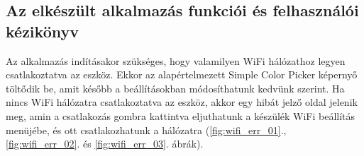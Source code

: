 \documentclass[../main.tex]{subfiles}
\begin{document}
    \subsection{Az elkészült alkalmazás funkciói és felhasználói kézikönyv}
        Az alkalmazás indításakor szükséges, hogy valamilyen WiFi hálózathoz legyen csatlakoztatva az eszköz. Ekkor az
        alapértelmezett Simple Color Picker képernyő töltődik be, amit később a beállításokban módosíthatunk kedvünk szerint. Ha nincs WiFi hálózatra csatlakoztatva az eszköz, akkor egy hibát jelző oldal jelenik meg, amin a csatlakozás gombra kattintva eljuthatunk a készülék WiFi beállítás menüjébe, és ott csatlakozhatunk a hálózatra (\ref{fig:wifi_err_01}., \ref{fig:wifi_err_02}. és \ref{fig:wifi_err_03}. ábrák).
        
              
\end{document}

